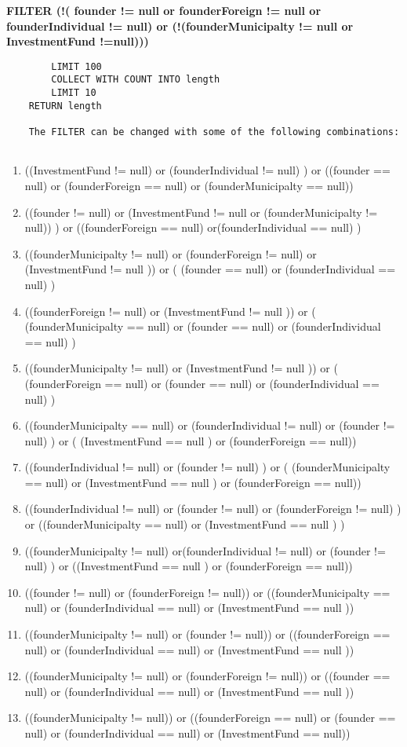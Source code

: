 \begin{enumerate}
\begin{verbatim}
	\end{verbatim}
		\textbf{FILTER  (!( founder != null or founderForeign != null  or founderIndividual != null) 
		or (!(founderMunicipalty != null or InvestmentFund !=null)))}
	\begin{verbatim}
	    LIMIT 100
	    COLLECT WITH COUNT INTO length
	    LIMIT 10
	RETURN length
	
	The FILTER can be changed with some of the following combinations: 
	
	\end{verbatim}
	
	\begin{enumerate}
		
	\item 	((InvestmentFund != null) or (founderIndividual != null)  ) or ((founder == null) or (founderForeign == null) or (founderMunicipalty == null))
	\item 	((founder != null) or (InvestmentFund != null or (founderMunicipalty != null))   ) or ((founderForeign == null) or(founderIndividual == null) )
	\item 	((founderMunicipalty != null) or (founderForeign != null) or (InvestmentFund != null )) or (  (founder == null) or  (founderIndividual == null) )
	\item 	((founderForeign != null) or (InvestmentFund != null )) or (  (founderMunicipalty == null) or (founder == null) or  (founderIndividual == null) )
	\item 	((founderMunicipalty != null) or (InvestmentFund != null )) or ( (founderForeign == null) or (founder == null) or  (founderIndividual == null) )
	\item 	((founderMunicipalty == null) or (founderIndividual != null) or (founder != null)  ) or ( (InvestmentFund == null ) or (founderForeign == null))
	\item 	((founderIndividual != null) or (founder != null)  ) or ( (founderMunicipalty == null) or (InvestmentFund == null ) or (founderForeign == null))
	\item 	((founderIndividual != null) or (founder != null) or (founderForeign != null) ) or ((founderMunicipalty == null) or (InvestmentFund == null ) )
	\item 	((founderMunicipalty != null) or(founderIndividual != null) or (founder != null)  ) or ((InvestmentFund == null ) or (founderForeign == null))
	\item 	((founder != null) or  (founderForeign != null)) or ((founderMunicipalty == null) or (founderIndividual == null) or   (InvestmentFund == null ))
	\item 	((founderMunicipalty != null) or (founder != null)) or ((founderForeign == null) or (founderIndividual == null) or   (InvestmentFund == null ))
	\item 	((founderMunicipalty != null) or (founderForeign != null)) or ((founder == null) or  (founderIndividual == null) or (InvestmentFund == null ))
	\item 	((founderMunicipalty != null)) or ((founderForeign == null) or (founder == null) or  (founderIndividual == null) or (InvestmentFund == null))
	\end{enumerate}


\end{enumerate}
